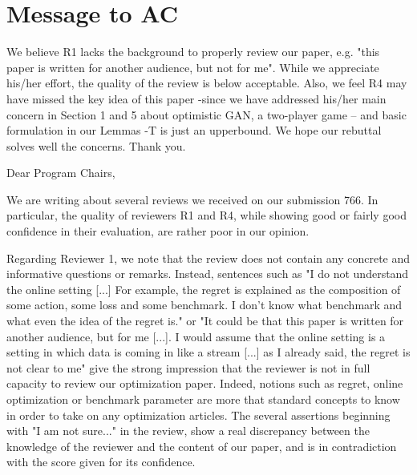 \documentclass{article}
\begin{document}
\newpage

\section{Message to AC}




{\color{red}  
We believe R1 lacks the background to properly review our paper, e.g. "this paper is written for another audience, but not for me". 
While we appreciate his/her effort, the quality of the review is below acceptable. 
Also, we feel R4 may have missed the key idea of this paper -since we have addressed his/her main concern in Section 1 and 5 about optimistic GAN, a two-player game -- and basic formulation in our Lemmas -T is just an upperbound.
We hope our rebuttal solves well the concerns.
Thank you.
}


\medskip

\medskip

Dear Program Chairs,

We are writing about several reviews we received on our submission 766.
In particular, the quality of reviewers R1 and R4, while showing good or fairly good confidence in their evaluation, are rather poor in our opinion.

Regarding Reviewer 1, we note that the review does not contain any concrete and informative questions or remarks.
Instead, sentences such as "I do not understand the online setting [...] For example, the regret is explained as the composition of some action, some loss and some benchmark. I don't know what benchmark and what even the idea of the regret is." or "It could be that this paper is written for another audience, but for me [...]. I would assume that the online setting is a setting in which data is coming in like a stream [...] as I already said, the regret is not clear to me" give the strong impression that the reviewer is not in full capacity to review our optimization paper. Indeed, notions such as regret, online optimization or benchmark parameter are more that standard concepts to know in order to take on any optimization articles.
The several assertions beginning with "I am not sure..." in the review, show a real discrepancy between the knowledge of the reviewer and the content of our paper, and is in contradiction with the score given for its confidence.
\end{document}
